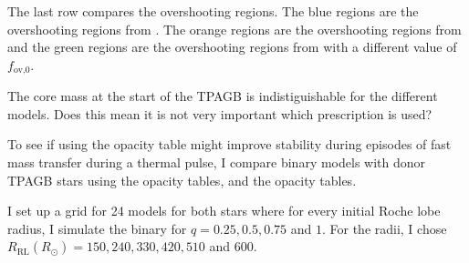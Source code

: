 \documentclass[a4paper,10pt]{article}
\begin{document}
The last row compares the overshooting regions. The blue regions are the overshooting regions from \citet{rees2024b}. The orange regions are the overshooting regions from \citet{temmink2022} and the green regions are the overshooting regions from \citet{temmink2022} with a different value of \(f _\text{ov,0}\).

\begin{figure}[ht]
    \centering
\end{figure}



\begin{figure}[ht]
    \centering
\end{figure}

\nextpage

\begin{figure}[ht]
    \centering
\end{figure}

\begin{figure}[ht]
    \centering
\end{figure}

\begin{figure}[ht]
    \centering
\end{figure}

\nextpage

\begin{figure}[ht]
    \centering
\end{figure}

\begin{figure}[ht]
    \centering
\end{figure}

The core mass at the start of the TPAGB is indistiguishable for the different models. Does this mean it is not very important which prescription is used?


To see if using the \citet{ferguson1905} opacity table might improve stability during episodes of fast mass transfer during a thermal pulse, I compare binary models with donor TPAGB stars using the \citet{ferguson1905} opacity tables, and the \citet{marigo2009} opacity tables.

I set up a grid for 24 models for both stars where for every initial Roche lobe radius, I simulate the binary for \(q=0.25, 0.5, 0.75\) and \(1\).
For the radii, I chose \(R_\text{RL} (R_\odot )= 150, 240, 330, 420, 510\) and \(600\).
\end{document}
